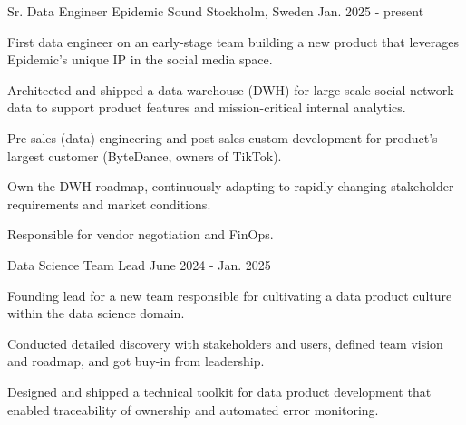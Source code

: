 

\begin{cventries}


  \cventry
    {Sr. Data Engineer} %
    {Epidemic Sound} %
    {Stockholm, Sweden} %
    {Jan. 2025 - present} %
    {
    First data engineer on an early-stage team building a new product that leverages Epidemic's unique IP in the social media space.
    \vspace{5.0mm}
      \begin{cvitems} %
        \item {Architected and shipped a data warehouse (DWH) for large-scale social network data to support product features and mission-critical internal analytics.}
        \item {Pre-sales (data) engineering and post-sales custom development for product's largest customer (ByteDance, owners of TikTok).}
        \item {Own the DWH roadmap, continuously adapting to rapidly changing stakeholder requirements and market conditions.}
        \item {Responsible for vendor negotiation and FinOps.}
      \end{cvitems}
    }

  \vspace{-1.0mm}
  \cventry
    {Data Science Team Lead} %
    {} %
    {} %
    {June 2024 - Jan. 2025} %
    {
    Founding lead for a new team responsible for cultivating a data product culture within the data science domain.
    \vspace{5.0mm}
      \begin{cvitems} %
        \item {Conducted detailed discovery with stakeholders and users, defined team vision and roadmap, and got buy-in from leadership. }
        \item {Designed and shipped a technical toolkit for data product development that enabled traceability of ownership and automated error monitoring. }
      \end{cvitems}
    }


\end{cventries}
